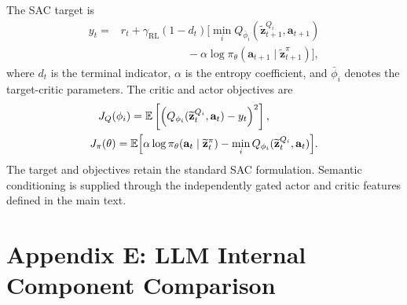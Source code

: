 \documentclass[11pt]{article}
\begin{document}
The SAC target is
\begin{equation}
\begin{aligned}
y_t
={}&
r_t+\gamma_{\mathrm{RL}}(1-d_t)
\big[
\min_i
Q_{\bar\phi_i}
(\widetilde{\mathbf{z}}_{t+1}^{Q_i},\mathbf{a}_{t+1})\\
&\hspace{6em}
-\alpha
\log
\pi_{\theta}
(\mathbf{a}_{t+1}
\mid
\widetilde{\mathbf{z}}_{t+1}^{\pi})
\big],
\end{aligned}
\label{eq:sac_target}
\end{equation}
where $d_t$ is the terminal indicator, $\alpha$ is the entropy coefficient, and $\bar\phi_i$ denotes the target-critic parameters. The critic and actor objectives are
\begin{equation}
\begin{aligned}
J_Q(\phi_i)
&=
\mathbb{E}
\left[
\left(
Q_{\phi_i}
(\widetilde{\mathbf{z}}_t^{Q_i},\mathbf{a}_t)
-y_t
\right)^2
\right],\\
J_{\pi}(\theta)
={}&
\mathbb{E}\Bigl[
\alpha
\log
\pi_{\theta}
(\mathbf{a}_t\mid\widetilde{\mathbf{z}}_t^{\pi})
-
\min_i
Q_{\phi_i}
(\widetilde{\mathbf{z}}_t^{Q_i},\mathbf{a}_t)
\Bigr].
\end{aligned}
\label{eq:sac_objectives}
\end{equation}
The target and objectives retain the standard SAC formulation. Semantic conditioning is supplied through the independently gated actor and critic features defined in the main text.

\clearpage
\section*{Appendix E: LLM Internal Component Comparison}
\end{document}
